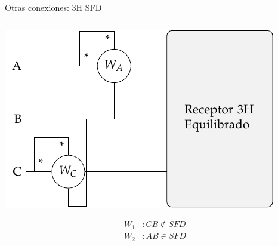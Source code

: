 \documentclass[aspectratio=169, usenames,svgnames,dvipsnames]{beamer}
\begin{document}
\begin{frame}[label={sec:org6eb96ac},plain]{Otras conexiones: 3H SFD}
\begin{columns}
\begin{column}{0.33\columnwidth}
\begin{center}
\includegraphics[width=.9\linewidth]{../figs/Potencia3H_Equilibrado_CA.pdf}
\end{center}
\begin{align*}
  W_1&: CB \notin SFD\\
  W_2&: AB \in SFD\\
\end{align*}
\end{column}
\end{columns}
\end{frame}
\end{document}
